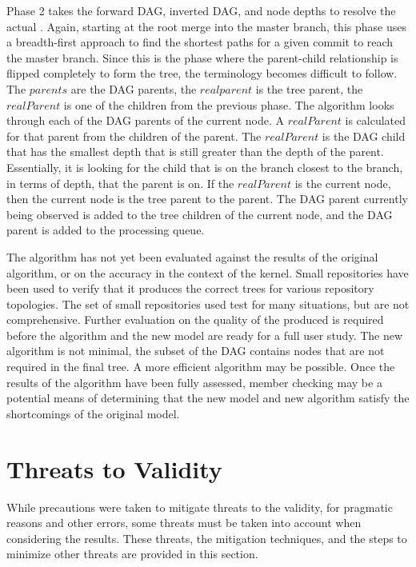 Phase 2 takes the forward DAG, inverted DAG, and node depths to resolve
the actual \mt{}. Again, starting at the root merge into the master
branch, this phase uses a breadth-first approach to find the shortest
paths for a given commit to reach the master branch. Since this is the
phase where the parent-child relationship is flipped completely to form
the tree, the terminology becomes difficult to follow. The $parents$ are
the DAG parents, the $realparent$ is the tree parent, the $realParent$
is one of the children from the previous phase. The algorithm looks
through each of the DAG parents of the current node. A $realParent$ is
calculated for that parent from the children of the parent. The
$realParent$ is the DAG child that has the smallest depth that is still
greater than the depth of the parent. Essentially, it is looking for the
child that is on the branch closest to the branch, in terms of depth,
that the parent is on. If the $realParent$ is the current node, then the
current node is the tree parent to the parent. The DAG parent currently
being observed is added to the tree children of the current node, and
the DAG parent is added to the processing queue. 

The algorithm has not yet been evaluated against the results of the
original algorithm, or on the accuracy in the context of the kernel.
Small repositories have been used to verify that it produces the correct
trees for various repository topologies. The set of small repositories
used test for many situations, but are not comprehensive. Further
evaluation on the quality of the  produced is required before the
algorithm and the new model are ready for a full user study. The new
algorithm is not minimal, the subset of the DAG contains nodes that are
not required in the final tree. A more efficient algorithm may be
possible. Once the results of the algorithm have been fully assessed,
member checking may be a potential means of determining that the new
model and new algorithm satisfy the shortcomings of the original model.

\section{Threats to Validity}\label{sec:threats_to_validity}

While precautions were taken to mitigate threats to the validity, for
pragmatic reasons and other errors, some threats must be taken into
account when considering the results. These threats, the mitigation
techniques, and the steps to minimize other threats are provided in this
section.
